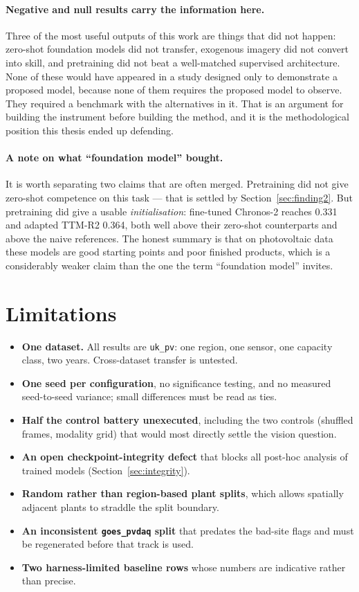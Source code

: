 \paragraph{Negative and null results carry the information here.} Three of the most useful
outputs of this work are things that did not happen: zero-shot foundation models did not
transfer, exogenous imagery did not convert into skill, and pretraining did not beat a
well-matched supervised architecture. None of these would have appeared in a study designed
only to demonstrate a proposed model, because none of them requires the proposed model to
observe. They required a benchmark with the alternatives in it. That is an argument for
building the instrument before building the method, and it is the methodological position
this thesis ended up defending.

\paragraph{A note on what ``foundation model'' bought.} It is worth separating two claims that
are often merged. Pretraining did not give zero-shot competence on this task --- that is
settled by Section~\ref{sec:finding2}. But pretraining did give a usable
\emph{initialisation}: fine-tuned Chronos-2 reaches 0.331 and adapted TTM-R2 0.364, both well
above their zero-shot counterparts and above the naive references. The honest summary is that
on photovoltaic data these models are good starting points and poor finished products, which
is a considerably weaker claim than the one the term ``foundation model'' invites.

\section{Limitations}
\label{sec:limitations}

\begin{itemize}
  \item \textbf{One dataset.} All results are \texttt{uk\_pv}: one region, one sensor, one
    capacity class, two years. Cross-dataset transfer is untested.
  \item \textbf{One seed per configuration}, no significance testing, and no measured
    seed-to-seed variance; small differences must be read as ties.
  \item \textbf{Half the control battery unexecuted}, including the two controls
    (shuffled frames, modality grid) that would most directly settle the vision question.
  \item \textbf{An open checkpoint-integrity defect} that blocks all post-hoc analysis of
    trained models (Section~\ref{sec:integrity}).
  \item \textbf{Random rather than region-based plant splits}, which allows spatially
    adjacent plants to straddle the split boundary.
  \item \textbf{An inconsistent \texttt{goes\_pvdaq} split} that predates the bad-site flags
    and must be regenerated before that track is used.
  \item \textbf{Two harness-limited baseline rows} whose numbers are indicative rather than
    precise.
\end{itemize}

